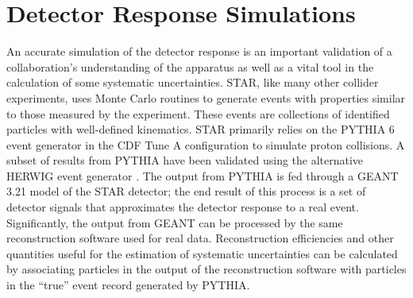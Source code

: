\section{Detector Response Simulations}

An accurate simulation of the detector response is an important validation of a collaboration's understanding of the apparatus as well as a vital tool in the calculation of some systematic uncertainties. STAR, like many other collider experiments, uses Monte Carlo routines to generate events with properties similar to those measured by the experiment.  These events are collections of identified particles with well-defined kinematics.  STAR primarily relies on the PYTHIA 6 event generator \cite{Sjostrand:2006za} in the CDF Tune A \cite{Field:2005sa} configuration to simulate proton collisions.  A subset of results from PYTHIA have been validated using the alternative HERWIG event generator \cite{Corcella:2000bw}.  The output from PYTHIA is fed through a GEANT 3.21 \cite{GEANT321} model of the STAR detector; the end result of this process is a set of detector signals that approximates the detector response to a real event.  Significantly, the output from GEANT can be processed by the same reconstruction software used for real data.  Reconstruction efficiencies and other quantities useful for the estimation of systematic uncertainties can be calculated by associating particles in the output of the reconstruction software with particles in the ``true'' event record generated by PYTHIA.
